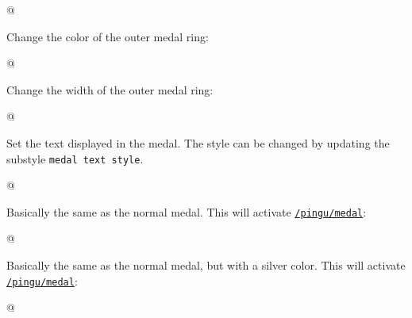 \documentclass[parskip=half,english,numbers=noenddot,footnotes=nomultiple,oneside]{scrartcl}
\def\lpingu#1{\lstinline[style=lstpingu,language=pingulang]'#1'}
\newcommand*\keyref[2][/pingu/]{\hyperref[pk:#1#2]{\lpingu{#1#2}}}
\begin{document}
\begin{tcblisting}{@}
\begin{tikzpicture}
	\pingu[medal, medal band=green]
\end{tikzpicture}
\end{tcblisting}
\endsubkeyexplain

{\def\pingu@color@medal{<medal-color>}
Change the color of the outer medal ring:
\begin{tcblisting}{@}
\begin{tikzpicture}
	\pingu[medal, medal shade=green]
\end{tikzpicture}
\end{tcblisting}
\endsubkeyexplain}

Change the width of the outer medal ring:
\begin{tcblisting}{@}
\begin{tikzpicture}
	\pingu[medal, medal shade=green,
	       medal shade width=2mm]
\end{tikzpicture}
\end{tcblisting}
\endsubkeyexplain

Set the text displayed in the medal. The style can be changed by
updating the substyle \texttt{medal text style}.
\begin{tcblisting}{@}
\begin{tikzpicture}
	\pingu[medal, medal text=XY,
	      medal text style/.style={black}]
\end{tikzpicture}
\end{tcblisting}
\endsubkeyexplain

Basically the same as the normal medal. This will activate \keyref{medal}:
\begin{tcblisting}{@}
\end{tcblisting}
\endkeyexplain

Basically the same as the normal medal, but with a silver color. This will activate \keyref{medal}:
\begin{tcblisting}{@}
\end{tcblisting}
\endkeyexplain
\end{document}
